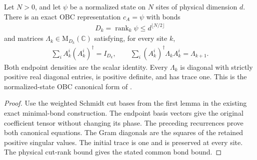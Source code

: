 \begin{theorem}
    \label{thm:obc_schmidt_canonical}
    \leanok
    Let $N>0$, and let $\psi$ be a normalized state on $N$ sites of
    physical dimension $d$. There is an exact OBC representation
    $c_A=\psi$ with bonds
    \begin{align}
        D_k=\operatorname{rank}_k\psi\le d^{\lfloor N/2\rfloor}
    \end{align}
    and matrices $\Lambda_k\in\mathrm M_{D_k}(\mathbb C)$ satisfying,
    for every site $k$,
    \begin{align}
        \sum_i A_k^i(A_k^i)^\dagger=I_{D_k},\qquad
        \sum_i(A_k^i)^\dagger\Lambda_kA_k^i=\Lambda_{k+1}.
    \end{align}
    Both endpoint densities are the scalar identity. Every
    $\Lambda_k$ is diagonal with strictly positive real diagonal
    entries, is positive definite, and has trace one. This is the
    normalized-state OBC canonical form of
    \cite[Theorem~1, conditions~1--3]{PerezGarcia2007Matrix}.
\end{theorem}
\begin{proof}
    \leanok
    Use the weighted Schmidt cut bases from the first lemma in the
    existing exact minimal-bond construction. The endpoint basis vectors
    give the original coefficient tensor without changing its phase.
    The preceding recurrences prove both canonical equations. The Gram
    diagonals are the squares of the retained positive singular values.
    The initial trace is one and is preserved at every site. The physical
    cut-rank bound gives the stated common bond bound.
\end{proof}

